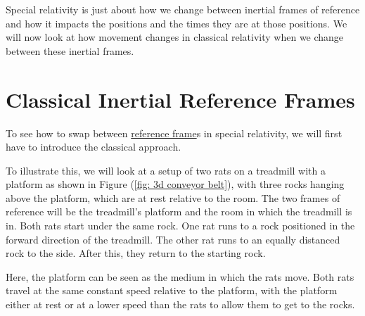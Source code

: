 Special relativity is just about how we change between inertial frames of reference and how it impacts the positions and the times they are at those positions.
We will now look at how movement changes in classical relativity when we change between these inertial frames.


\section{Classical Inertial Reference Frames} \label{sect: Classical Inertial Reference Frames}

To see how to swap between \hyperlink{def-Reference-frame}{reference frame}s in special relativity, we will first have to introduce the classical approach.

To illustrate this, we will look at a setup of two rats on a treadmill with a platform as shown in Figure (\ref{fig: 3d conveyor belt}), with three rocks hanging above the platform, which are at rest relative to the room.
The two frames of reference will be the treadmill's platform and the room in which the treadmill is in.
Both rats start under the same rock.
One rat runs to a rock positioned in the forward direction of the treadmill.
The other rat runs to an equally distanced rock to the side.
After this, they return to the starting rock.

Here, the platform can be seen as the medium in which the rats move.
Both rats travel at the same constant speed relative to the platform, with the platform either at rest or at a lower speed than the rats to allow them to get to the rocks.

